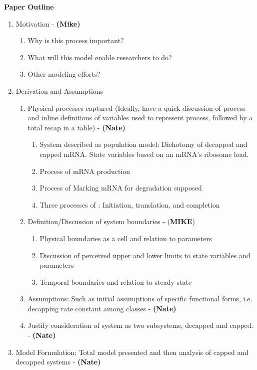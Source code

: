 \documentclass[review]{elsarticle}
\begin{document}
\textbf{Paper Outline}
\begin{enumerate}
\item Motivation - \textbf{(Mike)}
\begin{enumerate}
\item Why is this process important?
\item What will this model enable researchers to do?
\item Other modeling efforts?
\end{enumerate}
\item Derivation and Assumptions
\begin{enumerate}
\item Physical processes captured (Ideally, have a quick discussion of process and inline definitions of variables used to represent process, followed by a total recap in a table)  - \textbf{(Nate)}
\begin{enumerate}
\item System described as population model: Dichotomy of decapped and capped mRNA.
State variables based on an mRNA's ribosome load.
\item Process of mRNA production
\item Process of Marking mRNA for degradation supposed
\item Three processes of : Initiation, translation, and completion
\end{enumerate}
\item Definition/Discussion of system boundaries - (\textbf{MIKE})
\begin{enumerate}
\item Physical boundaries as a cell and relation to parameters
\item Discussion of perceived upper and lower limits to state variables and parameters
\item Temporal boundaries and relation to steady state
\end{enumerate}
\item Assumptions: Such as initial assumptions of specific functional forms, i.e. decapping rate constant among classes  - \textbf{(Nate)}
\item Justify consideration of system as two subsystems, decapped and capped.  - \textbf{(Nate)}
\end{enumerate}
\item Model Formulation: Total model presented and then analysis of capped and decapped systems  - \textbf{(Nate)}

\end{enumerate}
\end{document}
